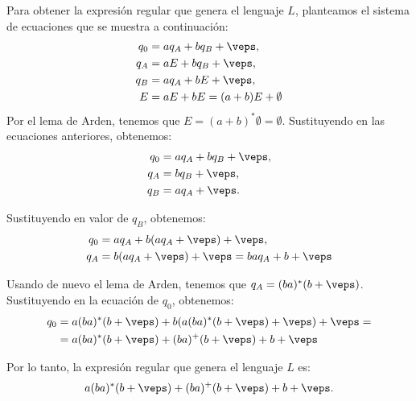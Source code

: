 \documentclass[12pt]{article}
\begin{document}
\begin{ejercicio}
        Para obtener la expresión regular que genera el lenguaje $L$, planteamos el sistema de ecuaciones que se muestra a continuación:
        \begin{align*}
            q_0 &= aq_A + bq_B + \veps,\\
            q_A &= aE + bq_B + \veps,\\
            q_B &= aq_A + bE + \veps,\\
            E &= aE + bE = (a+b)E + \emptyset
        \end{align*}
        Por el lema de Arden, tenemos que $E=(a+b)^*\emptyset = \emptyset$. Sustituyendo en las ecuaciones anteriores, obtenemos:
        \begin{align*}
            q_0 &= aq_A + bq_B + \veps,\\
            q_A &= bq_B + \veps,\\
            q_B &= aq_A + \veps.
        \end{align*}

        Sustituyendo en valor de $q_B$, obtenemos:
        \begin{align*}
            q_0 &= aq_A + b(aq_A + \veps) + \veps,\\
            q_A &= b(aq_A + \veps) + \veps = baq_A + b + \veps
        \end{align*}

        Usando de nuevo el lema de Arden, tenemos que $q_A = (ba)^*(b+\veps)$. Sustituyendo en la ecuación de $q_0$, obtenemos:
        \begin{align*}
            q_0 &= a(ba)^*(b+\veps) + b(a(ba)^*(b+\veps) + \veps) + \veps
            =\\&= a(ba)^*(b+\veps) + (ba)^+(b+\veps) + b + \veps
        \end{align*}

        Por lo tanto, la expresión regular que genera el lenguaje $L$ es:
        \begin{equation*}
            a(ba)^*(b+\veps) + (ba)^+(b+\veps) + b + \veps.
        \end{equation*}
    \end{ejercicio}
\end{document}
